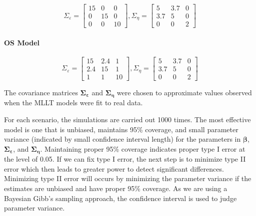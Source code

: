 \documentclass[
]{article}
\begin{document}
\begin{equation}\label{eq:S}
\Sigma_\varepsilon = 
\begin{bmatrix}
15 & 0 & 0\\
0 & 15 & 0\\
0 & 0 & 10
\end{bmatrix}, 
\Sigma_\eta =
\begin{bmatrix}
5 & 3.7 & 0\\
3.7 & 5 & 0\\
0 & 0 & 2
\end{bmatrix}
\end{equation}

\hypertarget{os-model}{%
\paragraph{OS Model}\label{os-model}}

\begin{equation}\label{eq:OS}
\Sigma_\varepsilon = 
\begin{bmatrix}
15 & 2.4 & 1\\
2.4 & 15 & 1\\
1 & 1 & 10
\end{bmatrix}, 
\Sigma_\eta =
\begin{bmatrix}
5 & 3.7 & 0\\
3.7 & 5 & 0\\
0 & 0 & 2
\end{bmatrix}
\end{equation}

The covariance matrices \(\boldsymbol{\Sigma_\varepsilon}\) and \(\boldsymbol{\Sigma_\eta}\) were chosen to approximate values observed when the MLLT models were fit to real data.

For each scenario, the simulations are carried out 1000 times. The most effective model is one that is unbiased, maintains 95\% coverage, and small parameter variance (indicated by small confidence interval length) for the parameters in \(\boldsymbol{\beta}\), \(\boldsymbol{\Sigma_\varepsilon}\), and \(\boldsymbol{\Sigma_\eta}\). Maintaining proper 95\% coverage indicates proper type I error at the level of 0.05. If we can fix type I error, the next step is to minimize type II error which then leads to greater power to detect significant differences. Minimizing type II error will occurs by minimizing the parameter variance if the estimates are unbiased and have proper 95\% coverage. As we are using a Bayesian Gibb's sampling approach, the confidence interval is used to judge parameter variance.
\end{document}
